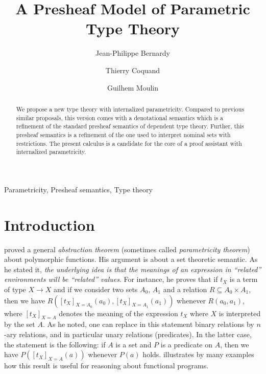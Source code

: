 \documentclass[english]{PaperTools/latex/entcs}
\theoremstyle{plain}
\theoremstyle{definition}
\theoremstyle{remark}
\begin{document}
\begin{frontmatter}
  \title{A Presheaf Model of Parametric Type Theory}
  \author{Jean-Philippe Bernardy}
  \author{Thierry Coquand}
  \author{Guilhem Moulin}
  \address{Chalmers University of Technology and University of Gothenburg \\
  \href{mailto:bernardy@chalmers.se,coquand@chalmers.se,mouling@chalmers.se}%
       {\textnormal\tt\{bernardy,coquand,mouling\}@chalmers.se}}
\begin{abstract}
  We propose a new type theory with internalized
  parametricity. Compared to previous similar proposals, this version
  comes with a denotational semantics which is a refinement of the
  standard presheaf semantics of dependent type theory. Further, this
  presheaf semantics is a refinement of the one used to interpret
  nominal sets with restrictions.  The present calculus is a candidate for the
  core of a proof assistant with internalized parametricity.
\end{abstract}
\begin{keyword}
  Parametricity, Presheaf semantics, Type theory
\end{keyword}
\end{frontmatter}

\section{Introduction}
\citet{reynolds_types_1983} proved a general \emph{abstraction theorem} (sometimes called
\emph{parametricity theorem}) about polymorphic functions. His argument is
about a set theoretic semantic.  As he stated it, {\em the underlying
  idea is that the meanings of an expression in ``related''
  environments will be ``related'' values}.  For instance, he proves
that if $t_X$ is a term of type $X → X$ and if we consider two sets
$A_0$, $A_1$ and a relation $R ⊆ A_0 × A_1$, then we have
$R([t_X]_{X=A_0}(a_0),[t_X]_{X=A_1}(a_1))$ whenever $R(a_0,a_1)$,
where $[t_X]_{X=A}$ denotes the meaning of the expression $t_X$ where
$X$ is interpreted by the set $A$. As he noted, one can replace in
this statement binary relations by $n$-ary relations, and in particular
unary relations (predicates). In the latter case, the statement is the following:
if $A$ is a set and $P$ is a predicate on $A$, then we have
$P([t_X]_{X=A}(a))$ whenever $P(a)$ holds.
\citet{wadler_theorems_1989} illustrates by many examples how this
result is useful for reasoning about functional programs.
\end{document}
